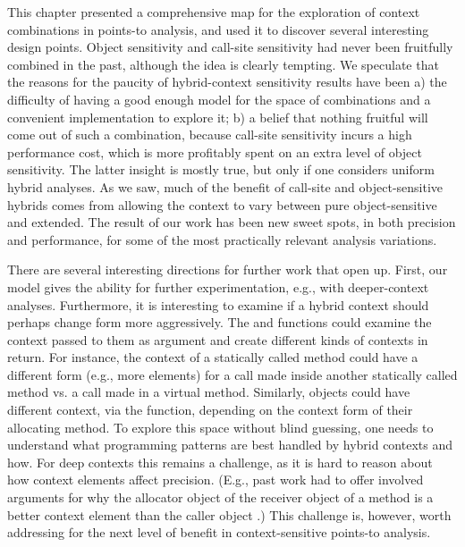 This chapter presented a comprehensive map for the exploration of context combinations in points-to analysis, and used it to discover several interesting design points. Object sensitivity and call-site sensitivity had never been fruitfully combined in the past, although the idea is clearly tempting. We speculate that the reasons for the paucity of hybrid-context sensitivity results have been a) the difficulty of having a good enough model for the space of combinations and a convenient implementation to explore it; b) a belief that nothing fruitful will come out of such a combination, because call-site sensitivity incurs a high performance cost, which is more profitably spent on an extra level of object sensitivity. The latter insight is mostly true, but only if one considers uniform hybrid analyses. As we saw, much of the benefit of call-site and object-sensitive hybrids comes from allowing the context to vary between pure object-sensitive and extended. The result of our work has been new sweet spots, in both precision and performance, for some of the most practically relevant analysis variations.

There are several interesting directions for further work that open up. First, our model gives the ability for further experimentation, e.g., with deeper-context analyses. Furthermore, it is interesting to examine if a hybrid context should perhaps change form more aggressively. The  and  functions could examine the context passed to them as argument and create different kinds of contexts in return. For instance, the context of a statically called method could have a different form (e.g., more elements) for a call made inside another statically called method vs. a call made in a virtual method. Similarly, objects could have different context, via the  function, depending on the context form of their allocating method. To explore this space without blind guessing, one needs to understand what programming patterns are best handled by hybrid contexts and how. For deep contexts this remains a challenge, as it is hard to reason about how context elements affect precision. (E.g., past work had to offer involved arguments for why the allocator object of the receiver object of a method is a better context element than the caller object  \cite{popl:2011:Smaragdakis}.) This challenge is, however, worth addressing for the next level of benefit in context-sensitive points-to analysis.